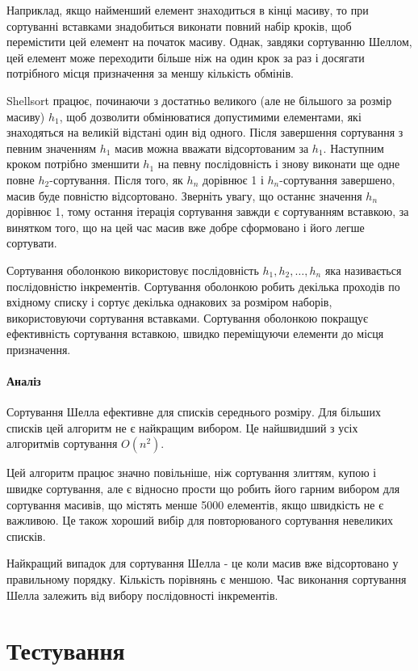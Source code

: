 Наприклад, якщо найменший елемент знаходиться в кінці масиву, то
при сортуванні вставками знадобиться виконати повний набір кроків, щоб
перемістити цей елемент на початок масиву. Однак, завдяки сортуванню Шеллом,
цей елемент може переходити більше ніж на один крок за раз і досягати
потрібного місця призначення за меншу кількість обмінів.

Shellsort працює, починаючи з достатньо великого (але не більшого за розмір
масиву) \(h_1\), щоб дозволити обмінюватися допустимими елементами, які
знаходяться на великій відстані один від одного. Після завершення сортування з
певним значенням \(h_1\) масив можна вважати відсортованим за \(h_1\).
Наступним кроком потрібно зменшити \(h_1\) на певну послідовність і знову
виконати ще одне повне \(h_2\)-сортування. Після того, як \(h_n\) дорівнює 1 і
\(h_n\)-сортування завершено, масив буде повністю відсортовано. Зверніть увагу,
що останнє значення \(h_n\) дорівнює 1, тому остання ітерація сортування завжди
є сортуванням вставкою, за винятком того, що на цей час масив вже добре
сформовано і його легше сортувати.

Сортування оболонкою використовує послідовність \(h_1,h_2,\dots,h_n\) яка називається
послідовністю інкрементів. Сортування оболонкою робить
декілька проходів по вхідному списку і сортує декілька однакових за розміром
наборів, використовуючи сортування вставками. Сортування оболонкою покращує
ефективність сортування вставкою, швидко переміщуючи елементи до місця
призначення.

\paragraph{Аналіз}
Сортування Шелла ефективне для списків середнього розміру. Для більших
списків цей алгоритм не є найкращим вибором. Це найшвидший з усіх алгоритмів
сортування \(O(n^2)\).

Цей алгоритм працює значно повільніше, ніж сортування злиттям, купою і швидке
сортування, але є відносно прости що робить його гарним вибором для
сортування масивів, що містять менше 5000 елементів, якщо швидкість не є
важливою. Це також хороший вибір для повторюваного сортування невеликих
списків.

Найкращий випадок для сортування Шелла - це коли масив вже відсортовано у
правильному порядку. Кількість порівнянь є меншою. Час виконання сортування
Шелла залежить від вибору послідовності інкрементів.

\section{Тестування}
